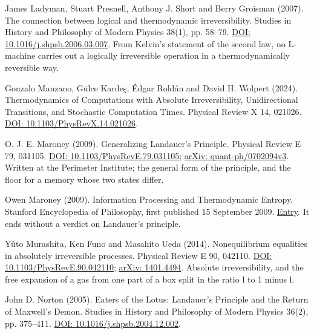 \documentclass[11pt,twoside]{article}
\theoremstyle{thielethm}
\theoremstyle{thieledef}
\theoremstyle{thieledef}
\theoremstyle{thieledef}
\theoremstyle{thielethm}
\theoremstyle{thieleobs}
\theoremstyle{thielethm}
\begin{document}
\noindent James Ladyman, Stuart Presnell, Anthony J. Short and Berry Groisman (2007). The connection between logical and thermodynamic irreversibility. Studies in History and Philosophy of Modern Physics 38(1), pp. 58--79. \href{https://doi.org/10.1016/j.shpsb.2006.03.007}{DOI: 10.1016/j.shpsb.2006.03.007}. From Kelvin's statement of the second law, no L-machine carries out a logically irreversible operation in a thermodynamically reversible way.
\par\medskip

\noindent Gonzalo Manzano, G\"ulce Karde\c{s}, \'Edgar Rold\'an and David H. Wolpert (2024). Thermodynamics of Computations with Absolute Irreversibility, Unidirectional Transitions, and Stochastic Computation Times. Physical Review X 14, 021026. \href{https://doi.org/10.1103/PhysRevX.14.021026}{DOI: 10.1103/PhysRevX.14.021026}.
\par\medskip

\noindent O. J. E. Maroney (2009). Generalizing Landauer's Principle. Physical Review E 79, 031105. \href{https://doi.org/10.1103/PhysRevE.79.031105}{DOI: 10.1103/PhysRevE.79.031105}; \href{https://arxiv.org/abs/quant-ph/0702094v3}{arXiv: quant-ph/0702094v3}. Written at the Perimeter Institute; the general form of the principle, and the floor for a memory whose two states differ.
\par\medskip

\noindent Owen Maroney (2009). Information Processing and Thermodynamic Entropy. Stanford Encyclopedia of Philosophy, first published 15 September 2009. \href{https://plato.stanford.edu/entries/information-entropy/}{Entry}. It ends without a verdict on Landauer's principle.
\par\medskip

\noindent Y\^uto Murashita, Ken Funo and Masahito Ueda (2014). Nonequilibrium equalities in absolutely irreversible processes. Physical Review E 90, 042110. \href{https://doi.org/10.1103/PhysRevE.90.042110}{DOI: 10.1103/PhysRevE.90.042110}; \href{https://arxiv.org/abs/1401.4494}{arXiv: 1401.4494}. Absolute irreversibility, and the free expansion of a gas from one part of a box split in the ratio l to 1 minus l.
\par\medskip

\noindent John D. Norton (2005). Eaters of the Lotus: Landauer's Principle and the Return of Maxwell's Demon. Studies in History and Philosophy of Modern Physics 36(2), pp. 375--411. \href{https://doi.org/10.1016/j.shpsb.2004.12.002}{DOI: 10.1016/j.shpsb.2004.12.002}.
\par\medskip
\end{document}
